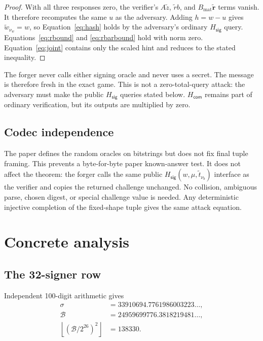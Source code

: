 \documentclass[10pt,a4paper]{article}
\newcommand{\Hsig}{H_{\mathsf{sig}}}
\newcommand{\Hcom}{H_{\mathsf{com}}}
\begin{document}
\begin{proof}
With all three responses zero, the verifier's $A\widetilde z$,
$\widetilde r b$, and $B_{\mathrm{mat}}\widetilde{\boldsymbol r}$ terms vanish.
It therefore recomputes the same $u$ as the adversary. Adding $h=w-u$ gives
$\widetilde w_{\nu_w}=w$, so Equation~\eqref{eq:hash} holds by the adversary's
ordinary $\Hsig$ query. Equations~\eqref{eq:rbound} and
\eqref{eq:rbarbound} hold with norm zero. Equation~\eqref{eq:joint} contains
only the scaled hint and reduces to the stated inequality.
\end{proof}

The forger never calls either signing oracle and never uses a secret. The
message is therefore fresh in the exact game. This is not a zero-total-query
attack: the adversary must make the public $\Hsig$ queries stated below.
$\Hcom$ remains part of ordinary verification, but its outputs are multiplied
by zero.

\subsection{Codec independence}

The paper defines the random oracles on bitstrings but does not fix final tuple
framing. This prevents a byte-for-byte paper known-answer test. It does not
affect the theorem: the forger calls the same public
$\Hsig(w,\mu,\widetilde t_{\nu_b})$ interface as the verifier and copies the
returned challenge unchanged. No collision, ambiguous parse, chosen digest,
or special challenge value is needed. Any deterministic injective completion
of the fixed-shape tuple gives the same attack equation.

\vspace{0.3\baselineskip}
\section{Concrete analysis}
\label{sec:analysis}

\subsection{The 32-signer row}

Independent 100-digit arithmetic gives
\begin{align*}
  \sigma &=33910694.7761986003223\ldots,\\
  \mathcal B&=24959699776.3818219481\ldots,\\
  \left\lfloor(\mathcal B/2^{26})^2\right\rfloor&=138330.
\end{align*}
\end{document}
